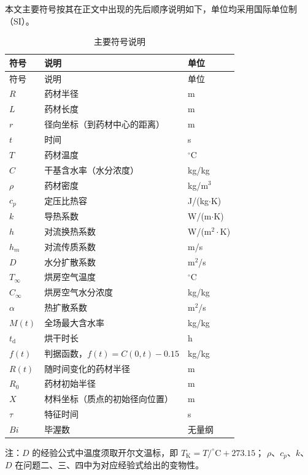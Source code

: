 \documentclass[12pt,a4paper]{article}
\begin{document}
本文主要符号按其在正文中出现的先后顺序说明如下，单位均采用国际单位制（SI）。
\begin{longtable}{>{\centering\arraybackslash}p{3cm}
                  >{\centering\arraybackslash}p{8cm}
                  >{\centering\arraybackslash}p{2cm}}
\caption{主要符号说明}
\label{tab:symbols}\\
\toprule
符号 & 说明 & 单位\\
\midrule
\endfirsthead

\toprule
符号 & 说明 & 单位\\
\midrule
\endhead

\bottomrule
\endlastfoot

$R$         & 药材半径 & m \\
$L$         & 药材长度 & m \\
$r$         & 径向坐标（到药材中心的距离） & m \\
$t$         & 时间 & s \\
$T$         & 药材温度 & $^\circ$C \\
$C$         & 干基含水率（水分浓度） & kg/kg \\
$\rho$      & 药材密度 & kg/m$^3$ \\
$c_p$       & 定压比热容 & J/(kg$\cdot$K) \\
$k$         & 导热系数 & W/(m$\cdot$K) \\
$h$         & 对流换热系数 & W/(m$^2\cdot$K) \\
$h_m$       & 对流传质系数 & m/s \\
$D$         & 水分扩散系数 & m$^2$/s \\
$T_\infty$  & 烘房空气温度 & $^\circ$C \\
$C_\infty$  & 烘房空气水分浓度 & kg/kg \\
$\alpha$    & 热扩散系数 & m$^2$/s \\
$M(t)$      & 全场最大含水率 & kg/kg \\
$t_{\mathrm d}$     & 烘干时长 & h \\
$f(t)$      & 判据函数，$f(t)=C(0,t)-0.15$ & kg/kg \\
$R(t)$      & 随时间变化的药材半径 & m \\
$R_0$       & 药材初始半径 & m \\
$X$         & 材料坐标（质点的初始径向位置） & m \\
$\tau$      & 特征时间 & s \\
$Bi$        & 毕渥数 & 无量纲 \\

\end{longtable}
注：$D$ 的经验公式中温度须取开尔文温标，即 $T_{\mathrm{K}}=T/^\circ\mathrm{C}+273.15$；
$\rho$、$c_p$、$k$、$D$ 在问题二、三、四中为对应经验式给出的变物性。
\end{document}
